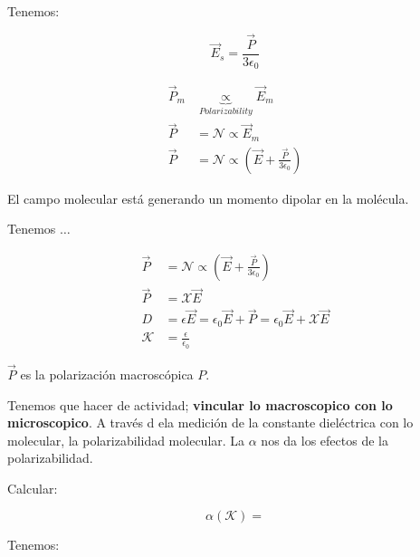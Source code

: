 \documentclass{article}
\begin{document}
Tenemos: 


\[ \boxed{ \vec{E}_{s} = \frac{ \vec{P}}{3\epsilon_{0}}} \]

\begin{equation}
\begin{split}
\vec{P}_{m}   &\underbrace{\propto}_{Polarizability} \vec{E}_{m} \\
\vec{P} &= \mathcal{N} \propto \vec{E}_{m}\\
\vec{P} &= \mathcal{N} \propto \left(  \vec{E} + \frac{ \vec{P}  }{3\epsilon_{0}}    \right)
\end{split}
\end{equation}

El campo molecular está generando un momento dipolar en la molécula.

Tenemos $\ldots$


\begin{equation}
\begin{split}  
 \vec{P}    &= \mathcal{N} \propto \left(  \vec{E} + \frac{\vec{P}  }{ 3\epsilon_{0} }  \right)\\
 \vec{P} &= \mathcal{X} \vec{E}\\
 D &= \epsilon \vec{E} = \epsilon_{0}\vec{E}+ \vec{P} = \epsilon_{0}\vec{E}+\mathcal{X}\vec{E}\\
  \mathcal{K} &= \frac{\epsilon}{\epsilon_{0}}
\end{split}
\end{equation}

$\vec{P}$ es la polarización macroscópica $P$.


Tenemos que hacer de actividad; \textbf{vincular lo macroscopico con lo microscopico}.  A través d ela medición de la constante dieléctrica con lo molecular, la polarizabilidad molecular. La $\alpha$ nos da los efectos de la polarizabilidad.


Calcular:

\[ \boxed{ \alpha( \mathcal{K} )   } =  \]

Tenemos: 
\end{document}
